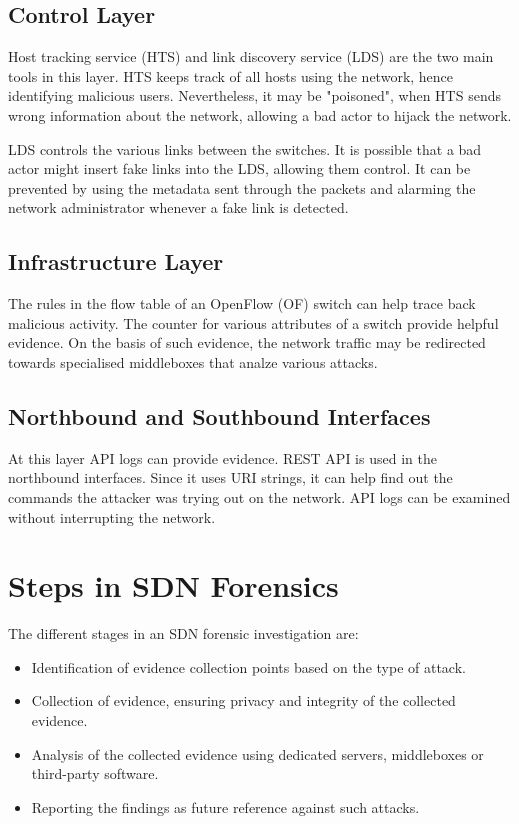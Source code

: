 \documentclass{article}
\begin{document}
\subsection{Control Layer}

Host tracking service (HTS) and link discovery service (LDS) are the two main tools in this layer. HTS keeps track of all hosts using the network, hence identifying malicious users. Nevertheless, it may be "poisoned", when HTS sends wrong information about the network, allowing a bad actor to hijack the network.

LDS controls the various links between the switches. It is possible that a bad actor might insert fake links into the LDS, allowing them control. It can be prevented by using the metadata sent through the packets and alarming the network administrator whenever a fake link is detected.

\subsection{Infrastructure Layer}

The rules in the flow table of an OpenFlow (OF) switch can help trace back malicious activity. The counter for various attributes of a switch provide helpful evidence. On the basis of such evidence, the network traffic may be redirected towards specialised middleboxes that analze various attacks.

\subsection{Northbound and Southbound Interfaces}

At this layer API logs can provide evidence. REST API is used in the northbound interfaces. Since it uses URI strings, it can help find out the commands the attacker was trying out on the network. API logs can be examined without interrupting the network.

\section{Steps in SDN Forensics}

The different stages in an SDN forensic investigation are:

\begin{itemize}
\item Identification of evidence collection points based on the type of attack.
\item Collection of evidence, ensuring privacy and integrity of the collected evidence.
\item Analysis of the collected evidence using dedicated servers, middleboxes or third-party software.
\item Reporting the findings as future reference against such attacks.
\end{itemize}
\end{document}
